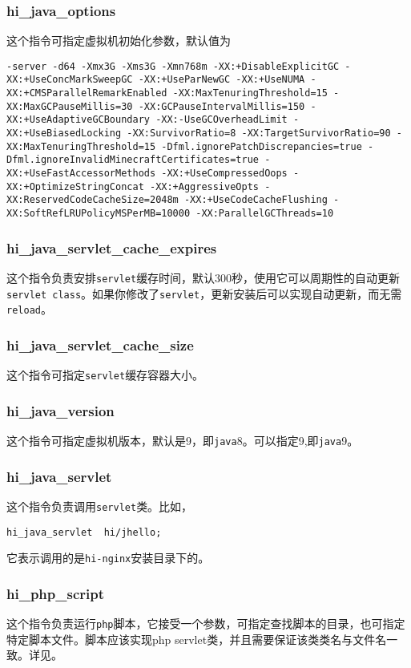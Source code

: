 \subsubsection{hi_java_options}
这个指令可指定虚拟机初始化参数，默认值为

\begin{lstlisting}
-server -d64 -Xmx3G -Xms3G -Xmn768m -XX:+DisableExplicitGC -XX:+UseConcMarkSweepGC -XX:+UseParNewGC -XX:+UseNUMA -XX:+CMSParallelRemarkEnabled -XX:MaxTenuringThreshold=15 -XX:MaxGCPauseMillis=30 -XX:GCPauseIntervalMillis=150 -XX:+UseAdaptiveGCBoundary -XX:-UseGCOverheadLimit -XX:+UseBiasedLocking -XX:SurvivorRatio=8 -XX:TargetSurvivorRatio=90 -XX:MaxTenuringThreshold=15 -Dfml.ignorePatchDiscrepancies=true -Dfml.ignoreInvalidMinecraftCertificates=true -XX:+UseFastAccessorMethods -XX:+UseCompressedOops -XX:+OptimizeStringConcat -XX:+AggressiveOpts -XX:ReservedCodeCacheSize=2048m -XX:+UseCodeCacheFlushing -XX:SoftRefLRUPolicyMSPerMB=10000 -XX:ParallelGCThreads=10
\end{lstlisting}

\subsubsection{hi_java_servlet_cache_expires}
这个指令负责安排\texttt{servlet}缓存时间，默认300秒，使用它可以周期性的自动更新\texttt{servlet class}。如果你修改了\texttt{servlet}，更新安装后可以实现自动更新，而无需\texttt{reload}。
\subsubsection{hi_java_servlet_cache_size}
这个指令可指定\texttt{servlet}缓存容器大小。
\subsubsection{hi_java_version}
这个指令可指定虚拟机版本，默认是9，即\texttt{java}8。可以指定9,即\texttt{java}9。
\subsubsection{hi_java_servlet}
这个指令负责调用\texttt{servlet}类。比如，
\begin{lstlisting}
hi_java_servlet  hi/jhello;
\end{lstlisting}
它表示调用的是\texttt{hi-nginx}安装目录下的。

\subsubsection{hi_php_script}
这个指令负责运行\texttt{php}脚本，它接受一个参数，可指定查找脚本的目录，也可指定特定脚本文件。脚本应该实现php servlet类，并且需要保证该类类名与文件名一致。详见。
















